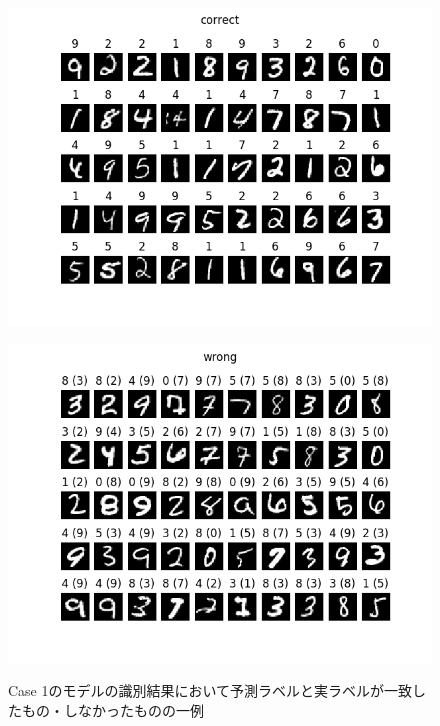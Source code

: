 \documentclass[class=jsarticle, crop=false, dvipdfmx, fleqn]{standalone}
\begin{document}
\begin{figure}
	\begin{minipage}[b]{0.45\linewidth}
		\centering
		\includegraphics[clip, width=\linewidth]{../figures/result_assignment2_case1_correct.png}
		\label{fig:case1_correct}
	\end{minipage}
	\begin{minipage}[b]{0.45\linewidth}
		\centering
		\includegraphics[clip, width=\linewidth]{../figures/result_assignment2_case1_wrong.png}
		\label{fig:case1_wrong}
	\end{minipage}
	\caption{Case 1のモデルの識別結果において予測ラベルと実ラベルが一致したもの・しなかったものの一例}
	\label{fig:case1_result}
\end{figure}
\end{document}
